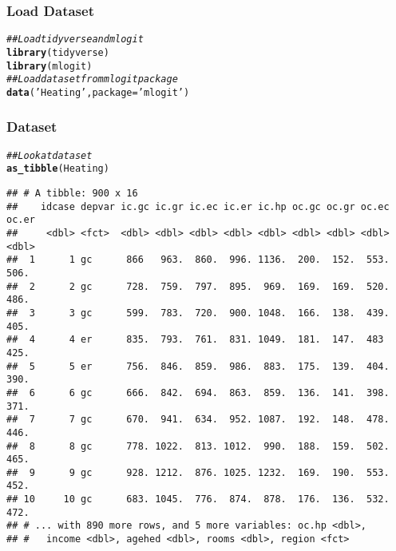 \documentclass{beamer}\usepackage[]{graphicx}\usepackage[]{color}
\makeatletter
\newcommand{\hlstr}[1]{\textcolor[rgb]{0.192,0.494,0.8}{#1}}%
\newcommand{\hlcom}[1]{\textcolor[rgb]{0.678,0.584,0.686}{\textit{#1}}}%
\newcommand{\hlstd}[1]{\textcolor[rgb]{0.345,0.345,0.345}{#1}}%
\newcommand{\hlkwc}[1]{\textcolor[rgb]{0.333,0.667,0.333}{#1}}%
\newcommand{\hlkwd}[1]{\textcolor[rgb]{0.737,0.353,0.396}{\textbf{#1}}}%
\newenvironment{kframe}{%
 \def\at@end@of@kframe{}%
 \ifinner\ifhmode%
  \def\at@end@of@kframe{\end{minipage}}%
  \begin{minipage}{\columnwidth}%
 \fi\fi%
 \def\FrameCommand##1{\hskip\@totalleftmargin \hskip-\fboxsep
 \colorbox{shadecolor}{##1}\hskip-\fboxsep
     \hskip-\linewidth \hskip-\@totalleftmargin \hskip\columnwidth}%
 \MakeFramed {\advance\hsize-\width
   \@totalleftmargin\z@ \linewidth\hsize
   \@setminipage}}%
 {\par\unskip\endMakeFramed%
 \at@end@of@kframe}
\newenvironment{knitrout}{}{} %
\makeatother
\begin{document}
\begin{frame}[fragile]\frametitle{Load Dataset}
\begin{knitrout}\footnotesize
{}\color{fgcolor}\begin{kframe}
\begin{alltt}
\hlcom{## Load tidyverse and mlogit}
\hlkwd{library}\hlstd{(tidyverse)}
\hlkwd{library}\hlstd{(mlogit)}
\hlcom{## Load dataset from mlogit package}
\hlkwd{data}\hlstd{(}\hlstr{'Heating'}\hlstd{,} \hlkwc{package} \hlstd{=} \hlstr{'mlogit'}\hlstd{)}
\end{alltt}
\end{kframe}
\end{knitrout}
\end{frame}

\begin{frame}[fragile]\frametitle{Dataset}
\begin{knitrout}\footnotesize
{}\color{fgcolor}\begin{kframe}
\begin{alltt}
\hlcom{## Look at dataset}
\hlkwd{as_tibble}\hlstd{(Heating)}
\end{alltt}
\begin{verbatim}
## # A tibble: 900 x 16
##    idcase depvar ic.gc ic.gr ic.ec ic.er ic.hp oc.gc oc.gr oc.ec oc.er
##     <dbl> <fct>  <dbl> <dbl> <dbl> <dbl> <dbl> <dbl> <dbl> <dbl> <dbl>
##  1      1 gc      866   963.  860.  996. 1136.  200.  152.  553.  506.
##  2      2 gc      728.  759.  797.  895.  969.  169.  169.  520.  486.
##  3      3 gc      599.  783.  720.  900. 1048.  166.  138.  439.  405.
##  4      4 er      835.  793.  761.  831. 1049.  181.  147.  483   425.
##  5      5 er      756.  846.  859.  986.  883.  175.  139.  404.  390.
##  6      6 gc      666.  842.  694.  863.  859.  136.  141.  398.  371.
##  7      7 gc      670.  941.  634.  952. 1087.  192.  148.  478.  446.
##  8      8 gc      778. 1022.  813. 1012.  990.  188.  159.  502.  465.
##  9      9 gc      928. 1212.  876. 1025. 1232.  169.  190.  553.  452.
## 10     10 gc      683. 1045.  776.  874.  878.  176.  136.  532.  472.
## # ... with 890 more rows, and 5 more variables: oc.hp <dbl>,
## #   income <dbl>, agehed <dbl>, rooms <dbl>, region <fct>
\end{verbatim}
\end{kframe}
\end{knitrout}
\end{frame}
\end{document}
